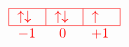\[
    \textcolor{red}{
        \begin{array}{c}
            \begin{tabular}{|m{0.5cm}|m{0.5cm}|m{0.5cm}|}
                \hline
                $\uparrow \downarrow$ & $\uparrow \downarrow$ & $\uparrow$ \\
                \hline
            \end{tabular} \\
            \begin{tabular}{m{0.5cm} m{0.5cm} m{0.5cm}}
                $-1$ & \text{ 0 } & $+1$
            \end{tabular}
        \end{array}
    }
\]